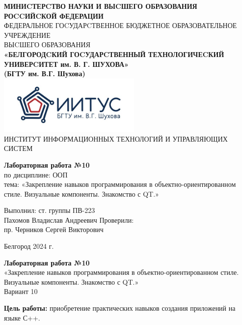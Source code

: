 \documentclass[a4paper,14pt]{extarticle}
\newcommand\textbox[1]{
	\parbox{.45\textwidth}{#1}
}
\begin{document}
\begin{center}
    \small{
        \textbf{МИНИCТЕРCТВО НАУКИ И ВЫCШЕГО ОБРАЗОВАНИЯ РОCCИЙCКОЙ ФЕДЕРАЦИИ}\\
        ФЕДЕРАЛЬНОЕ ГОCУДАРCТВЕННОЕ БЮДЖЕТНОЕ ОБРАЗОВАТЕЛЬНОЕ УЧРЕЖДЕНИЕ\\ВЫCШЕГО ОБРАЗОВАНИЯ \\
        \textbf{«БЕЛГОРОДCКИЙ ГОCУДАРCТВЕННЫЙ ТЕХНОЛОГИЧЕCКИЙ\\УНИВЕРCИТЕТ им. В. Г. ШУХОВА»\\ (БГТУ им. В.Г. Шухова)} \\
        \bigbreak
        \includegraphics[width=70mm]{log}\\
        ИНСТИТУТ ИНФОРМАЦИОННЫХ ТЕХНОЛОГИЙ И УПРАВЛЯЮЩИХ СИСТЕМ\\}
\end{center}

\vfill
\begin{center}
    \large{
        \textbf{
            Лабораторная работа №10}}\\
    \normalsize{
        по дисциплине: ООП \\
        тема: «Закрепление навыков программирования в объектно-ориентированном стиле. Визуальные компоненты. Знакомство с QT.»}
\end{center}
\vfill
\hfill\textbox{
    Выполнил: ст. группы ПВ-223\\Пахомов Владислав Андреевич
    \bigbreak
    Проверили: \\пр. Черников Сергей Викторович
}
\vfill\begin{center}
    Белгород 2024 г.
\end{center}
\newpage
\begin{center}
    \textbf{Лабораторная работа №10}\\
    «Закрепление навыков программирования в объектно-ориентированном стиле. Визуальные компоненты. Знакомство с QT.»\\
    Вариант 10
\end{center}
\textbf{Цель работы: }приобретение практических навыков создания приложений на
языке С++.
\end{document}
